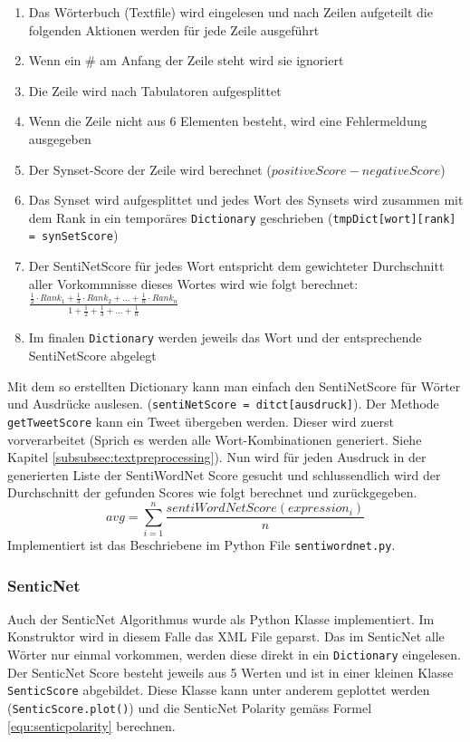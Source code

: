 \begin{enumerate}
	\item Das Wörterbuch (Textfile) wird eingelesen und nach Zeilen aufgeteilt die folgenden Aktionen werden für jede Zeile ausgeführt
	\item Wenn ein \# am Anfang der Zeile steht wird sie ignoriert
	\item Die Zeile wird nach Tabulatoren aufgesplittet
	\item Wenn die Zeile nicht aus 6 Elementen besteht, wird eine Fehlermeldung ausgegeben
	\item Der Synset-Score der Zeile wird berechnet ($positiveScore - negativeScore$)
	\item Das Synset wird aufgesplittet und jedes Wort des Synsets wird zusammen mit dem Rank in ein temporäres \lstinline$Dictionary$ geschrieben (\lstinline$tmpDict[wort][rank] = synSetScore$)
	\item Der SentiNetScore für jedes Wort entspricht dem gewichteter Durchschnitt aller Vorkommnisse dieses Wortes wird wie folgt berechnet: $\frac{\frac{1}{2}\cdot Rank_1 + \frac{1}{3} \cdot Rank_2 + ... + \frac{1}{n} \cdot Rank_n}{1+\frac{1}{2}+\frac{1}{3}+...+\frac{1}{n}}$
	\item Im finalen \lstinline$Dictionary$ werden jeweils das Wort und der entsprechende SentiNetScore abgelegt
\end{enumerate}

Mit dem so erstellten Dictionary kann man einfach den SentiNetScore für Wörter und Ausdrücke auslesen. (\lstinline$sentiNetScore = ditct[ausdruck]$). Der Methode \lstinline$getTweetScore$ kann ein Tweet übergeben werden. Dieser wird zuerst vorverarbeitet (Sprich es werden alle Wort-Kombinationen generiert. Siehe Kapitel \ref{subsubsec:textpreprocessing}). Nun wird für jeden Ausdruck in der generierten Liste der SentiWordNet Score gesucht und schlussendlich wird der Durchschnitt der gefunden Scores wie folgt berechnet und zurückgegeben.
\begin{equation}
avg = \sum_{i=1}^{n} \frac{sentiWordNetScore(expression_i)}{n}
\end{equation}
Implementiert ist das Beschriebene im Python File \lstinline$sentiwordnet.py$.

\subsubsection{SenticNet}
Auch der SenticNet Algorithmus wurde als Python Klasse implementiert. Im Konstruktor wird in diesem Falle das XML File geparst. Das im SenticNet alle Wörter nur einmal vorkommen, werden diese direkt in ein \lstinline$Dictionary$ eingelesen. Der SenticNet Score besteht jeweils aus 5 Werten und ist in einer kleinen Klasse \lstinline$SenticScore$ abgebildet. Diese Klasse kann unter anderem geplottet werden (\lstinline$SenticScore.plot()$) und die SenticNet Polarity gemäss Formel \ref{equ:senticpolarity} berechnen.

